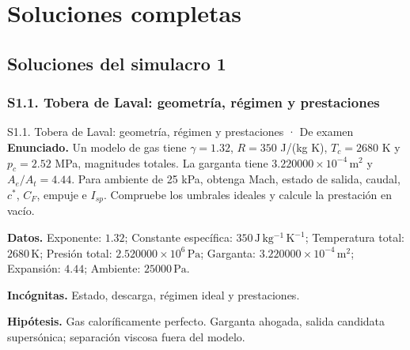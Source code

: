 \part{Soluciones completas}
\chapter{Soluciones del simulacro 1}
\section{S1.1. Tobera de Laval: geometría, régimen y prestaciones}
\begin{studiumworked}{S1.1. Tobera de Laval: geometría, régimen y prestaciones · De examen}
\textbf{Enunciado.} Un modelo de gas tiene $\gamma=1.32$, $R=350$ J/(kg K), $T_c=2680$ K y $p_c=2.52$ MPa, magnitudes totales. La garganta tiene $3.220000\times10^{-4}\,\mathrm{m^2}$ y $A_e/A_t=4.44$. Para ambiente de 25 kPa, obtenga Mach, estado de salida, caudal, $c^*$, $C_F$, empuje e $I_{sp}$. Compruebe los umbrales ideales y calcule la prestación en vacío.

\textbf{Datos.} Exponente: $1.32$; Constante específica: $350\,\mathrm{J\,kg^{-1}\,K^{-1}}$; Temperatura total: $2680\,\mathrm{K}$; Presión total: $2.520000\times10^{6}\,\mathrm{Pa}$; Garganta: $3.220000\times10^{-4}\,\mathrm{m^2}$; Expansión: $4.44$; Ambiente: $25000\,\mathrm{Pa}$.

\textbf{Incógnitas.} Estado, descarga, régimen ideal y prestaciones.

\textbf{Hipótesis.} Gas caloríficamente perfecto. Garganta ahogada, salida candidata supersónica; separación viscosa fuera del modelo.


\end{studiumworked}
